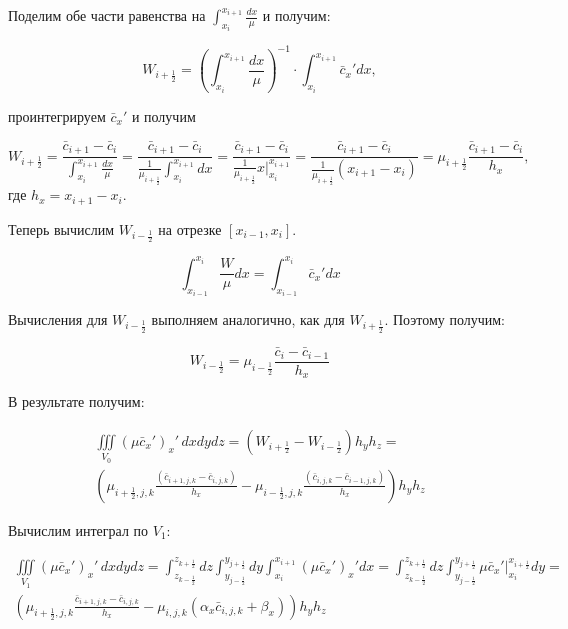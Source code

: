 \documentclass[12pt]{article}
\begin{document}
Поделим обе части равенства на $\int_{x_i}^{x_{i+1}}\frac{dx}{\mu}$ и получим:

\begin{equation*}
	W_{i+\frac{1}{2}}=\left(\int_{x_i}^{x_{i+1}}\frac{dx}{\mu}\right)^{-1}\cdot\int_{x_i}^{x_{i+1}}\bar{c}_x'dx,
\end{equation*}

проинтегрируем $\bar{c}_x'$ и получим 

\begin{equation*}
	W_{i+\frac{1}{2}}=\frac{\bar{c}_{i+1} - \bar{c}_{i}}{\int_{x_i}^{x_{i+1}}\frac{dx}{\mu}}=\frac{\bar{c}_{i+1} - \bar{c}_{i}}{\frac{1}{\mu_{i+\frac{1}{2}}}\int_{x_i}^{x_{i+1}}dx} = \frac{\bar{c}_{i+1}-\bar{c}_{i}} {\frac{1}{\mu_{i+\frac{1}{2}}}x\bigg|_{x_{i}}^{x_{i+1}}} = \frac{\bar{c}_{i+1} - \bar{c}_{i}} {\frac{1}{\mu_{i+\frac{1}{2}}} (x_{i+1} - x_i)} =\mu_{i+\frac{1}{2}} \frac{\bar{c}_{i+1} - \bar{c}_{i}} {h_{x}},
\end{equation*}
где $h_{x}=x_{i+1}- x_i$.

Теперь вычислим $W_{i-\frac{1}{2}}$  на отрезке $[x_{i-1}, x_i]$.

\begin{equation*}
\int_{x_{i-1}}^{x_{i}}\frac{W}{\mu}dx = \int_{x_{i-1}}^{x_{i}}\bar{c}_x'dx
\end{equation*}

Вычисления для $W_{i-\frac{1}{2}}$ выполняем аналогично, как для $W_{i+\frac{1}{2}}$. Поэтому получим:

\begin{equation*}
	W_{i-\frac{1}{2}} = \mu_{i-\frac{1}{2}} \frac{\bar{c}_{i} -\bar{c}_{i-1} }{h_{x}}	
\end{equation*}

В результате получим:

\begin{multline*} 
	\iiint\limits_{V_0} (\mu\bar{c}_x')_x'\,dxdydz = (W_{i+\frac{1}{2}} - W_{i-\frac{1}{2}})h_yh_z=  \\   \left(\mu_{i+\frac{1}{2},j,k}\frac{(\bar{c}_{i+1,j,k}- \bar{c}_{i,j,k})}{h_x} - \mu_{i-\frac{1}{2},j,k}\frac{(\bar{c}_{i,j,k}- \bar{c}_{i-1,j,k})}{h_x}\right)h_yh_z
\end{multline*} 

Вычислим интеграл по $V_1$:

\begin{multline*} 
	\iiint\limits_{V_1} (\mu\bar{c}_x')_x'\,dxdydz = \int_{z_{k-\frac{1}{2}}}^{z_{k+\frac{1}{2}}}dz    
	\int_{y_{j-\frac{1}{2}}}^{y_{j+\frac{1}{2}}}dy  
	\int_{x_{i}}^{x_{i+1}}(\mu\bar{c}_x')_x'dx = 
	\int_{z_{k-\frac{1}{2}}}^{z_{k+\frac{1}{2}}}dz    
	\int_{y_{j-\frac{1}{2}}}^{y_{j+\frac{1}{2}}}\mu\bar{c}_x'
	\bigg|_{x_{i}}^{x_{i+\frac{1}{2}}}dy =  \\
	\left(\mu_{i+\frac{1}{2},j,k} \frac{\bar{c}_{i+1,j,k}- \bar{c}_{i,j,k}}{h_x} - 
	\mu_{i,j,k}(\alpha_x\bar{c}_{i,j,k}+\beta_x) \right)h_yh_z 	    
\end{multline*} 
\end{document}
